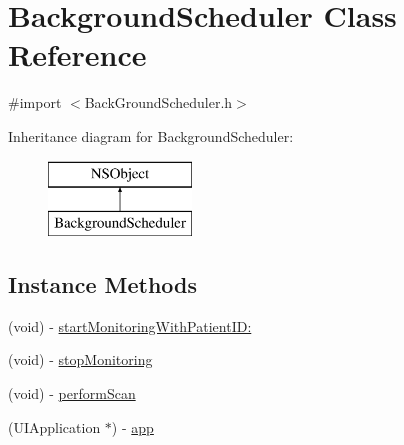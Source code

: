 \hypertarget{interface_background_scheduler}{\section{Background\-Scheduler Class Reference}
\label{interface_background_scheduler}
}


{\ttfamily \#import $<$Back\-Ground\-Scheduler.\-h$>$}

Inheritance diagram for Background\-Scheduler\-:\begin{figure}[H]
\begin{center}
\leavevmode
\includegraphics[height=2.000000cm]{interface_background_scheduler}
\end{center}
\end{figure}
\subsection*{Instance Methods}
\begin{DoxyCompactItemize}
\item 
(void) -\/ \hyperlink{interface_background_scheduler_a50173200d1b7dfc44b1d2d2a49ca75be}{start\-Monitoring\-With\-Patient\-I\-D\-:}
\item 
(void) -\/ \hyperlink{interface_background_scheduler_afa9c1aaf67ac8d9f5fd17a43475777eb}{stop\-Monitoring}
\item 
(void) -\/ \hyperlink{interface_background_scheduler_a11390d5d6bb62b2c565ca9205d045b2a}{perform\-Scan}
\item 
(U\-I\-Application $\ast$) -\/ \hyperlink{interface_background_scheduler_a393315828a032dece36a93c53ee203d0}{app}
\end{DoxyCompactItemize}
